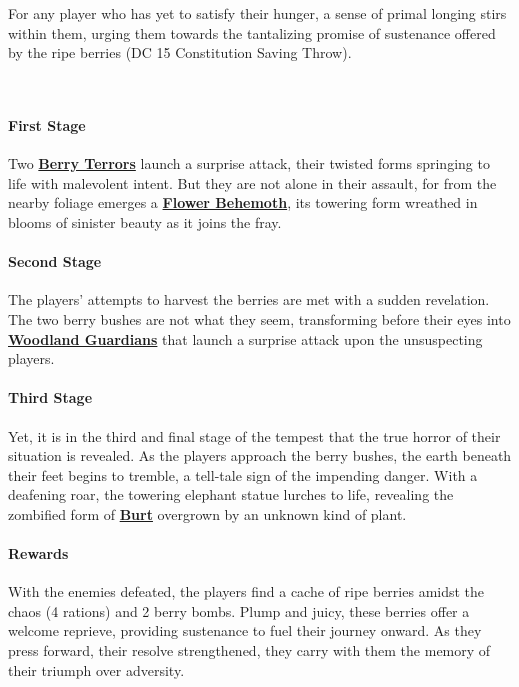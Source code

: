For any player who has yet to satisfy their hunger, a sense of primal longing stirs within them, urging them towards the tantalizing promise of sustenance offered by the ripe berries (DC 15 Constitution Saving Throw).

\hfill\\

\paragraph*{First Stage}
Two \hyperref[sec:BerryTerror]{\textbf{Berry Terrors}} launch a surprise attack, their twisted forms springing to life with malevolent intent. But they are not alone in their assault, for from the nearby foliage emerges a \hyperref[sec:FlowerBehemoth]{\textbf{Flower Behemoth}}, its towering form wreathed in blooms of sinister beauty as it joins the fray.

\paragraph*{Second Stage}
The players' attempts to harvest the berries are met with a sudden revelation. The two berry bushes are not what they seem, transforming before their eyes into \hyperref[sec:WoodlandGuardian]{\textbf{Woodland Guardians}} that launch a surprise attack upon the unsuspecting players.

\paragraph*{Third Stage}
Yet, it is in the third and final stage of the tempest that the true horror of their situation is revealed. As the players approach the berry bushes, the earth beneath their feet begins to tremble, a tell-tale sign of the impending danger. With a deafening roar, the towering elephant statue lurches to life, revealing the zombified form of \hyperref[sec:ZombifiedBurt]{\textbf{Burt}} overgrown by an unknown kind of plant.

\paragraph*{Rewards}
With the enemies defeated, the players find a cache of ripe berries amidst the chaos (4 rations) and 2 berry bombs. Plump and juicy, these berries offer a welcome reprieve, providing sustenance to fuel their journey onward. As they press forward, their resolve strengthened, they carry with them the memory of their triumph over adversity.

